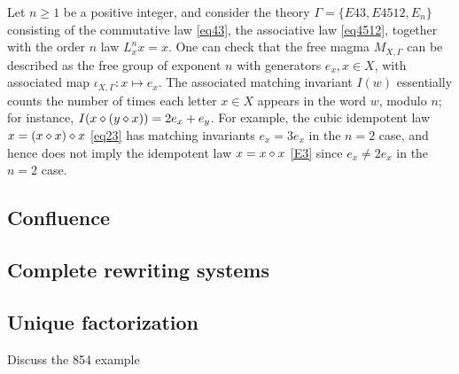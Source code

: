 \begin{example}  Let $n \geq 1$ be a positive integer, and consider the theory $\Gamma = \{E43, E4512, E_n\}$ consisting of the commutative law \eqref{eq43}, the associative law \eqref{eq4512}, together with the order $n$ law $L_x^n x = x$.  One can check that the free magma $M_{X,\Gamma}$ can be described as the free group of exponent $n$ with generators $e_x, x \in X$, with associated map $\iota_{X,\Gamma} \colon x \mapsto e_x$.  The associated matching invariant $I(w)$ essentially counts the number of times each letter $x \in X$ appears in the word $w$, modulo $n$; for instance, $I(x \diamond (y \diamond x)) = 2e_x + e_y$.  For example, the cubic idempotent law $x = (x \diamond x) \diamond x$ \eqref{eq23}
has matching invariants $e_x = 3e_x$ in the $n=2$ case, and hence does not imply the idempotent law $x = x \diamond x$ \eqref{E3} since $e_x \neq 2e_x$ in the $n=2$ case.
\end{example}


\subsection{Confluence}


\subsection{Complete rewriting systems}


\subsection{Unique factorization}

Discuss the 854 example
